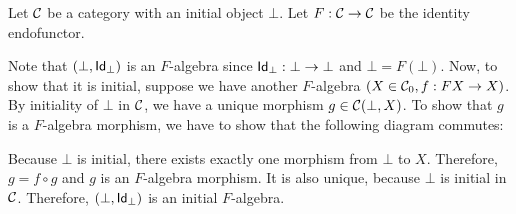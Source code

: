 \begin{solution}\label{sol:initialalg_for_idfun_with_initialob}
	Let $\CC$ be a category with an initial object $\bot$. Let $ F: \CC \to \CC $ be the identity endofunctor.

	Note that $ (\bot, \Id[\bot]) $ is an $ F $-algebra since $ \Id[\bot]: \bot \to \bot $ and $ \bot = F(\bot) $. Now, to show that it is initial, suppose we have another $ F $-algebra $ (X \in \Ob \CC, f: F X \to X) $. By initiality of $ \bot $ in $ \CC $, we have a unique morphism $ g \in \CC(\bot, X) $. To show that $ g $ is a $ F $-algebra morphism, we have to show that the following diagram commutes:
	\begin{center}
	\end{center}
	Because $ \bot $ is initial, there exists exactly one morphism from $ \bot $ to $ X $. Therefore, $ g = f \circ g $ and $ g $ is an $ F $-algebra morphism. It is also unique, because $ \bot $ is initial in $ \CC $. Therefore, $ (\bot, \Id[\bot]) $ is an initial $ F $-algebra.
\end{solution}



